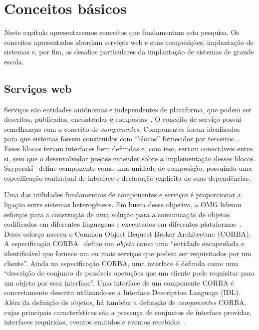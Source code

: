 \chapter{Conceitos básicos}
\label{cap:conceitos}

Neste capítulo apresentaremos conceitos que fundamentam esta pesquisa.
Os conceitos apresentados abordam serviços web e suas composições, 
implantação de sistemas e, por fim, os desafios particulares da implantação
de sistemas de grande escala.

\section{Serviços web}
\label{sec:servicos}

Serviços são entidades autônomas e independentes de plataforma, que podem ser descritas, publicadas, encontradas e compostas~\cite{Papazoglou2007State}. O conceito de serviço possui semelhanças com o conceito de \emph{componentes}. Componentes foram idealizados para que sistemas fossem construídos com ``blocos'' fornecidos por terceiros~\cite{McIlroy1968MassProduced}. Esses blocos teriam interfaces bem definidas e, com isso, seriam conectáveis entre si, sem que o desenvolvedor precise entender sobre a implementação desses blocos. Szyperski~\cite{Szyperski2003Component} define componente como uma unidade de composição, possuindo uma especificação contratual de interface e declaração explícita de suas dependências. 

Uma das utilidades fundamentais de componentes e serviços é proporcionar a ligação entre sistemas heterogêneos.
Em busca desse objetivo, a OMG liderou esforços para a construção de uma solução para a comunicação de objetos
codificados em diferentes linguagens e executados em diferentes plataformas~\cite{Szyperski2002Components}.
Desse esforço nasceu o Common Object Request Broker Architecture (CORBA).
A especificação CORBA~\cite{CORBA1995} define um \emph{objeto} como uma ``entidade encapsulada e identificável que fornece um ou mais serviços que podem ser requisitados por um cliente''. Ainda na especificação CORBA, uma interface é definida como uma ``descrição do conjunto de possíveis operações que um cliente pode requisitar para um objeto por essa interface''. Uma interface de um componente CORBA é concretamente descrita utilizando-se a Interface Description Language (IDL). 
Além da definição de objetos, há também a definição de \emph{componentes} CORBA, cujas principais características são 
a presença de conjuntos de interface providas, interfaces requiridas, eventos emitidos e eventos recebidos~\cite{Szyperski2002Components}.

